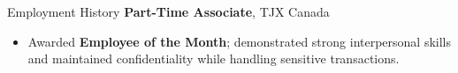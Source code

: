\begin{rubric}{Employment History}
\entry*[2022 -- 2024]
    \textbf{Part-Time Associate}, TJX Canada
    \begin{itemize}[leftmargin=*, nosep, label={\tiny$\bullet$}]
        \item Awarded \textbf{Employee of the Month}; demonstrated strong interpersonal skills and maintained confidentiality while handling sensitive transactions.
    \end{itemize}

\end{rubric}